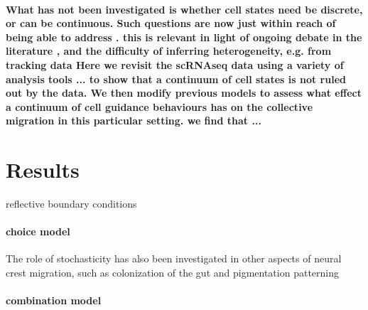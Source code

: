 \documentclass[review]{elsarticle}
\begin{document}
\paragraph{What has not been investigated is whether cell states need be discrete, or can be continuous. Such questions are now just within reach of being able to address \cite{Wagner2016}. this is relevant in light of ongoing debate in the literature \cite{Schumacher2016a,Richardson2016,Genuth2018}, and the difficulty of inferring heterogeneity, e.g. from tracking data \cite{Schumacher2017} Here we revisit the scRNAseq data \cite{Morrison2017} using a variety of analysis tools ... to show that a continuum of cell states is not ruled out by the data. We then modify previous models \cite{McLennan2015,McLennan2015b} to assess what effect a continuum of cell guidance behaviours has on the collective migration in this particular setting. we find that ...}

\section{Results}
reflective boundary conditions \cite{Kulesa2010,Szabo2016a}
\paragraph{choice model}
The role of stochasticity has also been investigated in other aspects of neural crest migration, such as colonization of the gut \cite{Binder2015,Smadbeck2015,Zhang2018} and pigmentation patterning \cite{Mort2016}

\paragraph{combination model}
\end{document}
